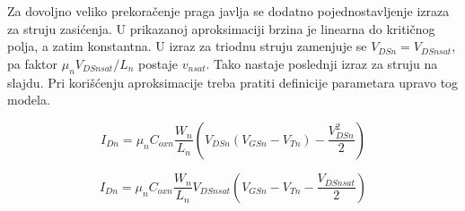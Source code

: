 Za dovoljno veliko prekoračenje praga javlja se dodatno pojednostavljenje izraza za struju zasićenja. U prikazanoj aproksimaciji brzina je linearna do kritičnog polja, a zatim konstantna. U izraz za triodnu struju zamenjuje se $V_{DSn}=V_{DSnsat}$, pa faktor $\mu_nV_{DSnsat}/L_n$ postaje $v_{nsat}$. Tako nastaje poslednji izraz za struju na slajdu. Pri korišćenju aproksimacije treba pratiti definicije parametara upravo tog modela.

\[I_{Dn}=\mu_nC_{oxn}\frac{W_n}{L_n}\left(V_{DSn}(V_{GSn}-V_{Tn})-\frac{V_{DSn}^2}{2}\right)\]

\[I_{Dn}=\mu_nC_{oxn}\frac{W_n}{L_n}V_{DSnsat}\left(V_{GSn}-V_{Tn}-\frac{V_{DSnsat}}2\right)\]


